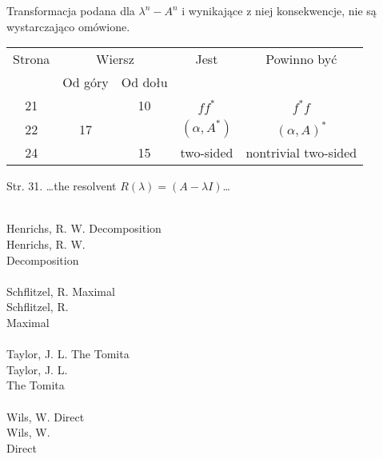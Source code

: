 \documentclass[a4paper,11pt]{article}
\begin{document}
\noindent
{} Transformacja podana dla $\lambda^{ n } - A^{ n }$ i
wynikające z niej konsekwencje, nie są wystarczająco omówione.

\vspace{\VerSpaceFour}






\newpage



\begin{center}
  \begin{tabular}{|c|c|c|c|c|}
    \hline
    Strona & \multicolumn{2}{c|}{Wiersz} & Jest
                              & Powinno być \\ \cline{2-3}
    & Od góry & Od dołu & & \\
    \hline
    21  & & 10 & $f f^{ * }$ & $f^{ * } f$ \\
    22  & 17 & & $( \alpha, A^{ * } )$ & $( \alpha, A )^{ * }$ \\
    24 & & 15 & two-sided & nontrivial two-sided \\
    \hline
  \end{tabular}

\end{center}

\vspace{\VerSpaceSix}


Str. 31. \ldots the resolvent $R( \lambda ) = ( A - \lambda I )$\ldots

\noindent
{} \\
\Jest  Henrichs, R. W. Decomposition \\
\Powin Henrichs, R. W. \\
Decomposition \\
 \\
\Jest  Schflitzel, R. Maximal \\
\Powin Schflitzel, R. \\
Maximal \\
 \\
\Jest  Taylor, J. L. The Tomita \\
\Powin Taylor, J. L. \\
The Tomita \\
 \\
\Jest  Wils, W. Direct \\
\Powin Wils, W. \\
Direct \\
\end{document}
